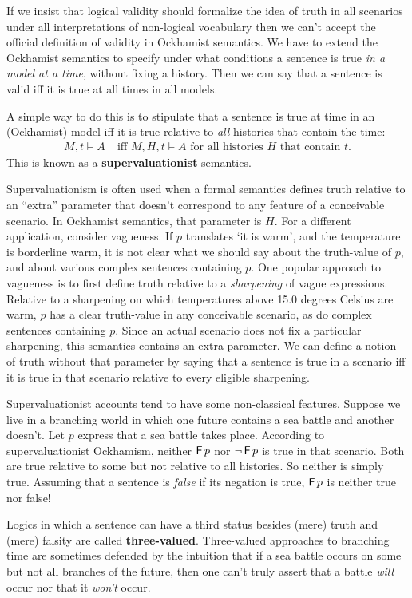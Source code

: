 If we insist that logical validity should formalize the idea of truth in all
scenarios under all interpretations of non-logical vocabulary then we can't
accept the official definition of validity in Ockhamist semantics. We have to
extend the Ockhamist semantics to specify under what conditions a sentence is
true \emph{in a model at a time}, without fixing a history. Then we can say that
a sentence is valid iff it is true at all times in all models.

A simple way to do this is to stipulate that a sentence is true at time in an
(Ockhamist) model iff it is true relative to \emph{all} histories that contain
the time:
\begin{align*}
  M,t \models A & \;\text{iff $M,H,t \models A$ for all histories $H$ that contain $t$}.
\end{align*}
This is known as a \textbf{supervaluationist} semantics.

Supervaluationism is often used when a formal semantics defines truth relative
to an ``extra'' parameter that doesn't correspond to any feature of a
conceivable scenario. In Ockhamist semantics, that parameter is $H$. For a
different application, consider vagueness. If $p$ translates `it is warm', and
the temperature is borderline warm, it is not clear what we should say about the
truth-value of $p$, and about various complex sentences containing $p$. One
popular approach to vagueness is to first define truth relative to a
\emph{sharpening} of vague expressions. Relative to a sharpening on which
temperatures above 15.0 degrees Celsius are warm, $p$ has a clear truth-value in
any conceivable scenario, as do complex sentences containing $p$. Since an
actual scenario does not fix a particular sharpening, this semantics contains an
extra parameter. We can define a notion of truth without that parameter by
saying that a sentence is true in a scenario iff it is true in that scenario
relative to every eligible sharpening.

Supervaluationist accounts tend to have some non-classical features. Suppose we
live in a branching world in which one future contains a sea battle and another
doesn't. Let $p$ express that a sea battle takes place. According to
supervaluationist Ockhamism, neither $\operatorname{\mathsf{F}} p$ nor $\neg \operatorname{\mathsf{F}} p$ is true in that
scenario. Both are true relative to some but not relative to all histories.
So neither is simply true. Assuming that a sentence is \emph{false}
if its negation is true, $\operatorname{\mathsf{F}} p$ is neither true nor false!

Logics in which a sentence can have a third status besides (mere) truth and
(mere) falsity are called \textbf{three-valued}. Three-valued approaches to
branching time are sometimes defended by the intuition that if a sea battle
occurs on some but not all branches of the future, then one can't truly assert
that a battle \emph{will} occur nor that it \emph{won't} occur.

